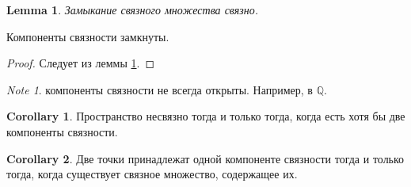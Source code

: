\documentclass[11pt]{book}
\newcommand{\Q}{\mathbb{Q}}
\theoremstyle{definition}
\theoremstyle{plain}
\theoremstyle{plain}
\newtheorem*{lm}{Lemma}
\theoremstyle{definition}
\newtheorem*{cor}{Corollary}
\theoremstyle{remark}
\newtheorem*{note}{Note}
\begin{document}
\begin{lm}\label{lm_cl_ss}
    Замыкание связного множества связно.
\end{lm}
\begin{thm}
    Компоненты связности замкнуты.
\end{thm}
\begin{proof}
    Следует из леммы \ref{lm_cl_ss}.
\end{proof}
\begin{note}
    компоненты связности не всегда открыты. Например,  в $ \Q$.
\end{note}
\begin{cor}
    Пространство несвязно  тогда и только тогда, когда есть хотя бы две компоненты связности.
\end{cor}
\begin{cor}
    Две точки принадлежат одной компоненте связности тогда и только тогда, когда существует связное множество, содержащее их.
\end{cor}
\end{document}
